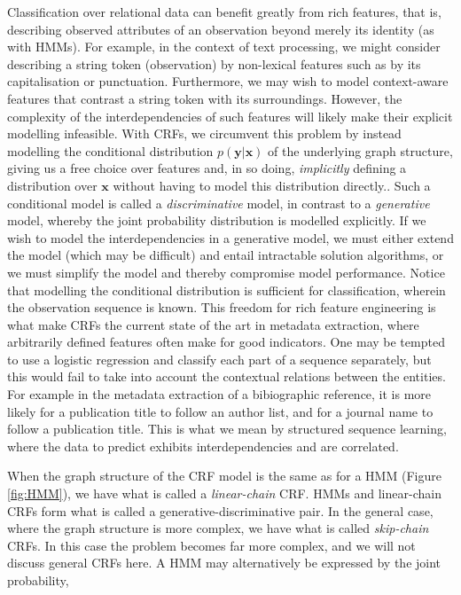 Classification over relational data can benefit greatly from rich features, that is, describing observed attributes of an observation beyond merely its identity (as with HMMs). For example, in the context of text processing, we might consider describing a string token (observation) by non-lexical features such as by its capitalisation or punctuation. Furthermore, we may wish to model context-aware features that contrast a string token with its surroundings. However, the complexity of the interdependencies of such features will likely make their explicit modelling infeasible. With CRFs, we circumvent this problem by instead modelling the conditional distribution $p(\mathbf{y}|\mathbf{x})$ of the underlying graph structure, giving us a free choice over features and, in so doing, \emph{implicitly} defining a distribution over $\mathbf{x}$ without having to model this distribution directly.\cite{sutton2006introduction}. Such a conditional model is called a \emph{discriminative} model, in contrast to a \emph{generative} model, whereby the joint probability distribution is modelled explicitly. If we wish to model the interdependencies in a generative model, we must either extend the model (which may be difficult) and entail intractable solution algorithms, or we must simplify the model and thereby compromise model performance. Notice that modelling the conditional distribution is sufficient for classification, wherein the observation sequence is known. This freedom for rich feature engineering is what make CRFs the current state of the art in metadata extraction, where arbitrarily defined features often make for good indicators. One may be tempted to use a logistic regression and classify each part of a sequence separately, but this would fail to take into account the contextual relations between the entities. For example in the metadata extraction of a bibiographic reference, it is more likely for a publication title to follow an author list, and for a journal name to follow a publication title. This is what we mean by structured sequence learning, where the data to predict exhibits interdependencies and are correlated.

When the graph structure of the CRF model is the same as for a HMM (Figure \ref{fig:HMM}), we have what is called a \emph{linear-chain} CRF. HMMs and linear-chain CRFs form what is called a generative-discriminative pair. In the general case, where the graph structure is more complex, we have what is called \emph{skip-chain} CRFs. In this case the problem becomes far more complex, and we will not discuss general CRFs here. A HMM may alternatively be expressed by the joint probability,

